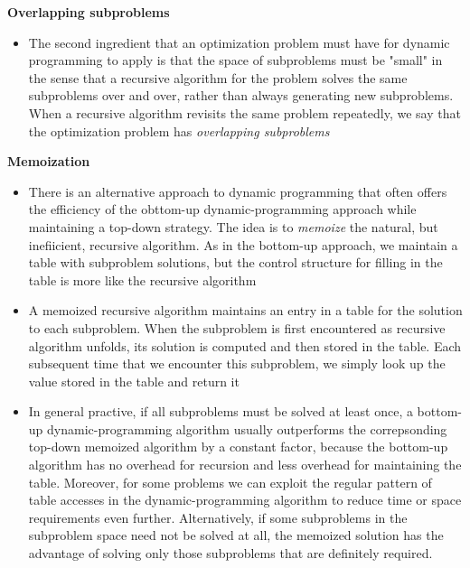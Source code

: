 \documentclass{report}
\begin{document}
\textbf{Overlapping subproblems}
\begin{itemize}
    \item The second ingredient that an optimization problem must have for dynamic programming to apply is that the space of subproblems must be "small" in the sense that a recursive algorithm for the problem solves the same subproblems over and over, rather than always generating new subproblems. When a recursive algorithm revisits the same problem repeatedly, we say that the optimization problem has \textit{overlapping subproblems}
\end{itemize}

\textbf{Memoization}
\begin{itemize}
    \item There is an alternative approach to dynamic programming that often offers the efficiency of the obttom-up dynamic-programming approach while maintaining a top-down strategy. The idea is to \textit{memoize} the natural, but inefiicient, recursive algorithm. As in the bottom-up approach, we maintain a table with subproblem solutions, but the control structure for filling in the table is more like the recursive algorithm
    \item A memoized recursive algorithm maintains an entry in a table for the solution to each subproblem. When the subproblem is first encountered as recursive algorithm unfolds, its solution is computed and then stored in the table. Each subsequent time that we encounter this subproblem, we simply look up the value stored in the table and return it
    \item In general practive, if all subproblems must be solved at least once, a bottom-up dynamic-programming algorithm usually outperforms the correpsonding top-down memoized algorithm by a constant factor, because the bottom-up algorithm has no overhead for recursion and less overhead for maintaining the table. Moreover, for some problems we can exploit the regular pattern of table accesses in the dynamic-programming algorithm to reduce time or space requirements even further. Alternatively, if some subproblems in the subproblem space need not be solved at all, the memoized solution has the advantage of solving only those subproblems that are definitely required.
\end{itemize}
\end{document}
